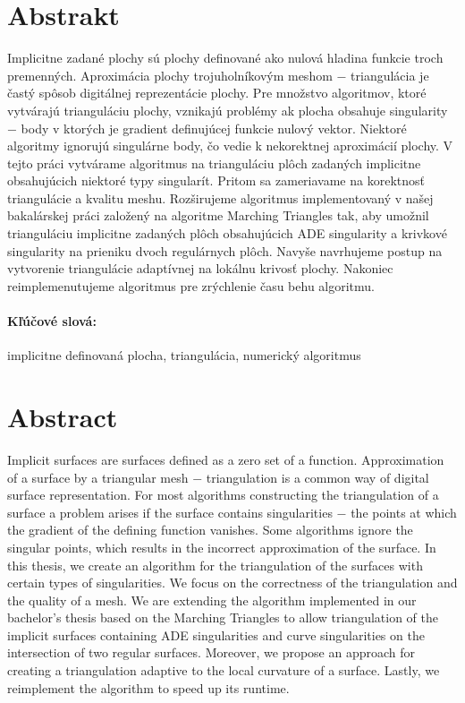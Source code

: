 \documentclass[12pt, twoside]{book}
\begin{document}

\newpage 
\section*{Abstrakt}

Implicitne zadané plochy sú plochy definované ako nulová hladina
funkcie troch premenných. 
Aproximácia plochy trojuholníkovým meshom $-$ triangulácia
je častý spôsob digitálnej reprezentácie plochy.
Pre množstvo algoritmov, ktoré vytvárajú trianguláciu plochy,
vznikajú problémy ak plocha obsahuje singularity $-$ body v ktorých je gradient 
definujúcej funkcie nulový vektor.
Niektoré algoritmy
ignorujú singulárne body, čo vedie k nekorektnej aproximácií plochy.
V tejto práci vytvárame algoritmus na trianguláciu plôch zadaných implicitne
obsahujúcich niektoré typy singularít. Pritom sa zameriavame na korektnosť
triangulácie a kvalitu meshu.
Rozširujeme algoritmus implementovaný v našej bakalárskej práci
založený na algoritme Marching Triangles tak,
aby umožnil trianguláciu implicitne zadaných plôch obsahujúcich 
ADE singularity a krivkové singularity na prieniku dvoch regulárnych plôch.
Navyše navrhujeme postup na vytvorenie triangulácie adaptívnej na 
lokálnu krivosť plochy. Nakoniec reimplemenutujeme algoritmus 
pre zrýchlenie času behu algoritmu.
\paragraph*{Kľúčové slová:} implicitne definovaná plocha, triangulácia, numerický algoritmus



\newpage 
\section*{Abstract}Implicit surfaces are surfaces defined as a zero set of a function.
Approximation of a surface by a triangular mesh $-$ triangulation 
is a common way of digital surface representation.
For most algorithms constructing the triangulation of a surface
a problem arises if the surface contains singularities $-$ the points at which 
the gradient of the defining function vanishes.
Some algorithms
ignore the singular points, which results in the incorrect approximation
of the surface.
In this thesis, we create an algorithm for the triangulation of 
the surfaces with certain types of singularities. We focus on the
correctness of the triangulation and the quality of a mesh.
We are extending the algorithm implemented in our bachelor's thesis
based on the Marching Triangles to allow 
triangulation of the implicit surfaces containing ADE singularities
and curve singularities on the intersection of two regular surfaces.
Moreover, we propose an approach for creating a triangulation adaptive 
to the local curvature of a surface. Lastly, we reimplement the 
algorithm to speed up its runtime.
\end{document}
